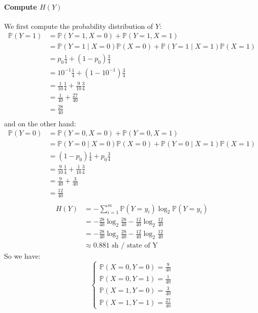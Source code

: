 \documentclass{article}
\newcommand{\1}{\mathbf{1}}
\renewcommand{\P}{\mathbb{P}}
\begin{document}
\paragraph{Compute $H(Y)$}
We first compute the probability distribution of $Y$:
\begin{align*}
  \P(Y = 1)
   & = \P(Y = 1, X = 0) + \P(Y = 1, X = 1)                             \\
   & = \P(Y = 1 \mid X = 0) \P(X = 0) + \P(Y = 1 \mid X = 1) \P(X = 1) \\
   & = p_0 \frac{1}{4} + (1 - p_0) \frac{3}{4}                         \\
   & = 10^{-1} \frac{1}{4} + (1 - 10^{-1}) \frac{3}{4}                 \\
   & = \frac{1}{10} \frac{1}{4} + \frac{9}{10} \frac{3}{4}             \\
   & = \frac{1}{40} + \frac{27}{40}                                    \\
   & = \frac{28}{40}                                                   \\
\end{align*}
and on the other hand:
\begin{align*}
  \P(Y = 0)
   & = \P(Y = 0, X = 0) + \P(Y = 0, X = 1)                             \\
   & = \P(Y = 0 \mid X = 0) \P(X = 0) + \P(Y = 0 \mid X = 1) \P(X = 1) \\
   & = (1 - p_0) \frac{1}{4} + p_0 \frac{3}{4}                         \\
   & = \frac{9}{10} \frac{1}{4} + \frac{1}{10} \frac{3}{4}             \\
   & = \frac{9}{40} + \frac{3}{40}                                     \\
   & = \frac{12}{40}                                                   \\
\end{align*}
\begin{align*}
  H(Y) & = - \sum_{i=1}^{m} \P(Y = y_i) \log_2 \P(Y = y_i)                           \\
       & = - \frac{28}{40} \log_2 \frac{28}{40} - \frac{12}{40} \log_2 \frac{12}{40} \\
       & = - \frac{28}{40} \log_2 \frac{28}{40} - \frac{12}{40} \log_2 \frac{12}{40} \\
       & \approx 0.881 \text{ sh / state of Y}
\end{align*}
So we have:
$$
  \begin{cases}
    \P(X = 0, Y = 0) = \frac{9}{40} \\
    \P(X = 0, Y = 1) = \frac{1}{40} \\
    \P(X = 1, Y = 0) = \frac{3}{40} \\
    \P(X = 1, Y = 1) = \frac{27}{40}
  \end{cases}
$$
\end{document}
